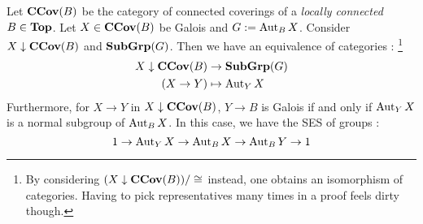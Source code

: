 \documentclass[./main.tex]{subfiles}
\begin{document}
\begin{prop}
  
  Let $\mathbf{CCov}(B)$ be the category of connected coverings 
  of a \emph{locally connected} $B \in \mathbf{Top}$.
  Let $X \in \mathbf{CCov}(B)$ be Galois and $G := \operatorname{Aut}_B X$.
  Consider $X \downarrow \mathbf{CCov}(B)$ and $\mathbf{Sub}\mathbf{Grp}(G)$.
  Then we have an equivalence of categories : \footnote{
    By considering $(X\downarrow \mathbf{CCov}(B))/\cong_{}$ instead,
    one obtains an isomorphism of categories.
    Having to pick representatives many times in a proof 
    feels dirty though. 
  }
  \begin{align*}
    X\downarrow\mathbf{CCov}(B) &\to \mathbf{Sub}\mathbf{Grp}(G) \\
    (X \to Y) &\mapsto \operatorname{Aut}_Y X
  \end{align*}
  Furthermore, for $X \to Y$ in $X\downarrow \mathbf{CCov}(B)$,
  $Y \to B$ is Galois if and only if 
  $\operatorname{Aut}_Y X$ is a normal subgroup of $\operatorname{Aut}_B X$.
  In this case, we have the SES of groups : 
  \[
    1 \to \operatorname{Aut}_Y X \to \operatorname{Aut}_B X \to \operatorname{Aut}_B Y \to 1
  \]
\end{prop}
\end{document}
